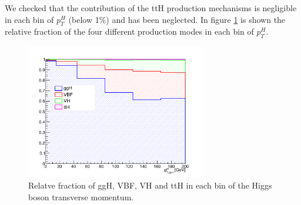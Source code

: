 We checked that the contribution of the ttH production mechanisms is negligible in each bin of $p_T^H$ (below 1\%) and has been neglected. In figure \ref{fig:signal_comp} is shown the relative fraction of the four different production modes in each bin of $p_T^H$.

\begin{figure}[htb]
\centering
\includegraphics[width=0.7\textwidth]{images/signal_composition_ttH.pdf}
\caption{Relatve fraction of ggH, VBF, VH and ttH in each bin of the Higgs boson transverse momentum.}\label{fig:signal_comp}
\end{figure}
